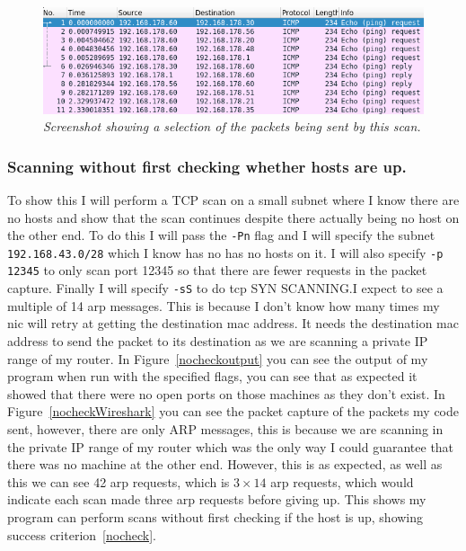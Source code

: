 \documentclass[titlepage]{article}
\let\Oldsubsubsection\subsubsection{}
\renewcommand{\subsubsection}{\FloatBarrier\Oldsubsubsection}
\begin{document}
\begin{figure}[H]
  \centering
  \includegraphics[width=\textwidth]{pingscantest_Wireshark.png}
  \caption{\textit{%
    Screenshot showing a selection of the packets being sent by this scan.
}}\label{lanscanWireshark}
\end{figure}

\subsubsection{Scanning without first checking whether hosts are up.}\label{test:nocheck}
To show this I will perform a TCP scan on a small subnet where I
know there are no hosts and show that the scan continues despite there actually
being no host on the other end. To do this I will pass the \verb|-Pn| flag
and I will specify the subnet \verb|192.168.43.0/28| which I know has no has no hosts
on it. I will also specify \verb|-p 12345| to only scan port 12345 so that there are
fewer requests in the packet capture. Finally I will specify \verb|-sS| to do \gls{tcp}
SYN SCANNING.\@ I expect to see a multiple of 14 \gls{arp} messages.
This is because I don't know how many times my \gls{nic} will retry at getting
the destination \gls{mac} address. It needs the destination \gls{mac} address to send
the packet to its destination as we are scanning a private IP range of my router.
In Figure~\ref{nocheckoutput} you can see the output of my program when run with the
specified flags, you can see that as expected it showed that there were no open ports
on those machines as they don't exist. In Figure~\ref{nocheckWireshark} you can see the
packet capture of the packets my code sent, however, there are only ARP messages, this is
because we are scanning in the private IP range of my router which was the only
way I could guarantee that there was no machine at the other end. However, this is
as expected, as well as this we can see 42 \gls{arp} requests, which is $3\times14$
\gls{arp} requests, which would indicate each scan made three \gls{arp} requests before
giving up. This shows my program can perform scans without first checking if the host is
up, showing success criterion~\ref{nocheck}.
\end{document}
